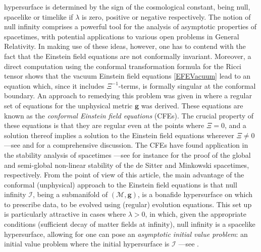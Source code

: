 \documentclass[10pt,a4paper]{article}
\theoremstyle{plain}
\def\bmg{{\bm g}}
\newcounter{mnotecount}%
\newcommand{\mnotex}[1]%
{\protect{\stepcounter{mnotecount}}$^{\mbox{\footnotesize $\bullet$\themnotecount}}$ 
\marginpar{%
\raggedright\tiny\em
$\!\!\!\!\!\!\,\bullet$\themnotecount: #1} }
\begin{document}
hypersurface is determined by the sign of the cosmological constant,
being null, spacelike or timelike if $\lambda$ is zero, positive or
negative respectively. The notion of null infinity comprises a powerful tool
for the analysis of asymptotic properties of spacetimes, with potential applications to various open problems in General Relativity.
In making use of these ideas, however, one has to contend with the fact that the Einstein field
equations are not conformally invariant. Moreover, a direct
computation using the conformal transformation formula for the Ricci
tensor shows that the vacuum Einstein field equations
\eqref{EFEVacuum} lead to an equation which, since it includes $\Xi^{-1}$-terms, is formally singular at
the conformal boundary. An approach to remedying this problem was
given in \cite{Fri81a} where a regular set of equations for the
unphysical metric $\bmg$ was derived. These equations are known as the
\emph{conformal Einstein field equations} (CFEs).  The crucial
property of these equations is that they are regular even at the points
where $\Xi=0$, and a solution thereof implies a
solution to the Einstein field equations wherever $\Xi\neq 0$ ---see \cite{Fri81a,Fri83}
and \cite{CFEbook} for a comprehensive discussion. 
The CFEs have found application in
the stability analysis of spacetimes ---see for instance \cite{Fri86b,
  Fri86c} for the proof of the global and semi-global non-linear
stability of the de Sitter and Minkowski spacetimes, respectively.
From the point of view of this article, the main advantage of the conformal
(unphysical) approach to the Einstein field equations is that null
infinity $\mathscr{I}$, being a submanifold of $(\mathcal{M},\bmg)$, is a bonafide hypersurface on which to prescribe data, to be evolved using
(regular) evolution equations. This set
up is particularly attractive in cases where $\lambda>0$, in
which, given the appropriate conditions (sufficient decay of matter fields
at infinity), null infinity is a spacelike hypersurface, allowing for one can pose an \emph{asymptotic initial value problem}: an
initial value problem where the initial hypersurface is $\mathscr{I}$
---see \cite{GasVal17,MarPaeSenSim16, LueVal09}.

\medskip
\end{document}
